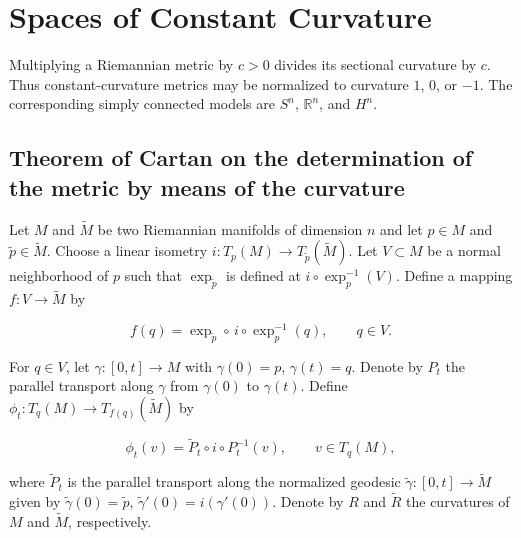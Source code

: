 \chapter{Spaces of Constant Curvature}
\label{chap:dc-spaces-of-constant-curvature}

Multiplying a Riemannian metric by $c>0$ divides its sectional curvature by
$c$. Thus constant-curvature metrics may be normalized to curvature $1$, $0$,
or $-1$. The corresponding simply connected models are $S^n$, $\mathbb R^n$,
and $H^n$.

\section{Theorem of Cartan on the determination of the metric by means of the curvature}

Let $M$ and $\tilde{M}$ be two Riemannian manifolds of dimension $n$ and let
$p\in M$ and $\tilde{p}\in\tilde{M}$. Choose a linear isometry
$i:T_p(M)\to T_{\tilde{p}}(\tilde{M})$. Let $V\subset M$ be a normal neighborhood
of $p$ such that $\exp_{\tilde{p}}$ is defined at $i\circ\exp_p^{-1}(V)$. Define a
mapping $f:V\to\tilde{M}$ by

$$
f(q)=\exp_{\tilde{p}}\circ\,i\circ\exp_p^{-1}(q),\qquad q\in V.
$$

For $q\in V$, let $\gamma:[0,t]\to M$
with $\gamma(0)=p$, $\gamma(t)=q$. Denote by $P_t$ the parallel transport along
$\gamma$ from $\gamma(0)$ to $\gamma(t)$. Define $\phi_t:T_q(M)\to T_{f(q)}(\tilde{M})$
by

$$
\phi_t(v)=\tilde{P}_t\circ i\circ P_t^{-1}(v),\qquad v\in T_q(M),
$$

where $\tilde{P}_t$ is the parallel transport along the normalized geodesic
$\tilde{\gamma}:[0,t]\to\tilde{M}$ given by $\tilde{\gamma}(0)=\tilde{p}$,
$\tilde{\gamma}'(0)=i(\gamma'(0))$. Denote by $R$ and $\tilde{R}$ the curvatures of
$M$ and $\tilde{M}$, respectively.

